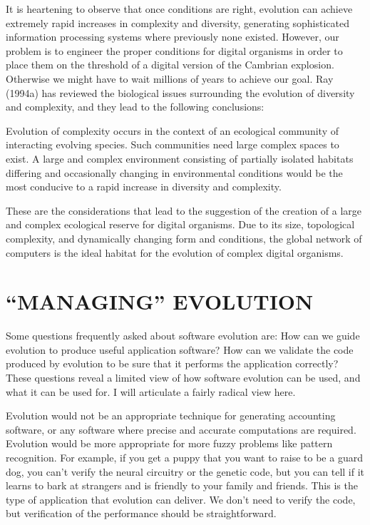 It is heartening to observe that once conditions are right, evolution
can achieve extremely rapid increases in complexity and diversity, generating
sophisticated information processing systems where previously none existed.
However, our problem is to engineer the proper conditions for digital
organisms in order to place them on the threshold of a digital version of
the Cambrian explosion.  Otherwise we might have to wait millions of
years to achieve our goal.  Ray (1994a) has reviewed the biological
issues surrounding the evolution of diversity and complexity, and
they lead to the following conclusions:

Evolution of complexity occurs in the context of an ecological community
of interacting evolving species.  Such communities need large complex spaces
to exist.  A large and complex environment consisting of partially isolated
habitats differing and occasionally changing in environmental conditions
would be the most conducive to a rapid increase in diversity and complexity.

These are the considerations that lead to the suggestion of the creation
of a large and complex ecological reserve for digital organisms.  Due to
its size, topological complexity, and dynamically changing form and
conditions, the global network of computers is the ideal habitat for the
evolution of complex digital organisms.

\section{\bf ``MANAGING'' EVOLUTION}

Some questions frequently asked about software evolution are:
How can we guide evolution to produce useful application software?
How can we validate the code produced by evolution to be sure that
it performs the application correctly?  These questions reveal a limited
view of how software evolution can be used, and what it can be used for.
I will articulate a fairly radical view here.

Evolution would not be an appropriate technique for generating accounting
software, or any software where precise and accurate computations are
required.  Evolution would be more appropriate for more fuzzy problems
like pattern recognition.  For example, if you get a puppy that you want
to raise to be a guard dog, you can't verify the neural circuitry or the
genetic code, but you can tell if it learns to bark at strangers and
is friendly to your family and friends.  This is the type of application
that evolution can deliver.  We don't need to verify the code, but
verification of the performance should be straightforward.

